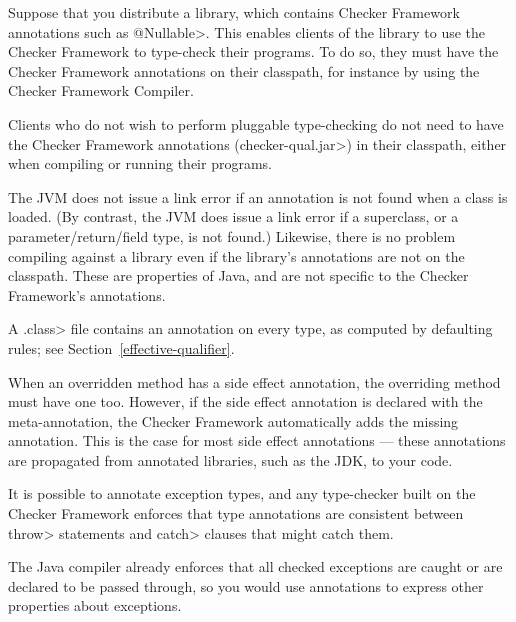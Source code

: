 
Suppose that you distribute a library, which contains Checker Framework
annotations such as \<@Nullable>.  This enables clients of the library to
use the Checker Framework to type-check their programs.  To do so, they
must have the Checker Framework annotations on their classpath, for
instance by using the Checker Framework Compiler.

Clients who do not wish to perform pluggable type-checking do not need to
have the Checker Framework annotations
(\<checker-qual.jar>) in their classpath, either when compiling or running
their programs.

The JVM does not issue a link error if an annotation is not found when a
class is loaded.  (By contrast, the JVM does issue a link error if a
superclass, or a parameter/return/field type, is not found.)
Likewise, there is no problem compiling against a library even if the
library's annotations are not on the classpath.
These are properties of Java, and are not specific to the Checker
Framework's annotations.



A \<.class> file contains an annotation on every type, as computed by
defaulting rules; see Section~\ref{effective-qualifier}.

When an overridden method has a side effect annotation, the overriding
method must have one too.  However, if the side effect annotation is
declared with the 
meta-annotation, the Checker Framework automatically adds the missing
annotation.  This is the case for most side effect annotations --- these
annotations are propagated from annotated libraries, such as the JDK, to
your code.



It is possible to annotate exception types, and any type-checker built on the
Checker Framework enforces that type annotations are consistent between
\<throw> statements and \<catch> clauses that might catch them.

The Java compiler already enforces that all checked exceptions are caught
or are declared to be passed through, so you would use annotations to
express other properties about exceptions.

